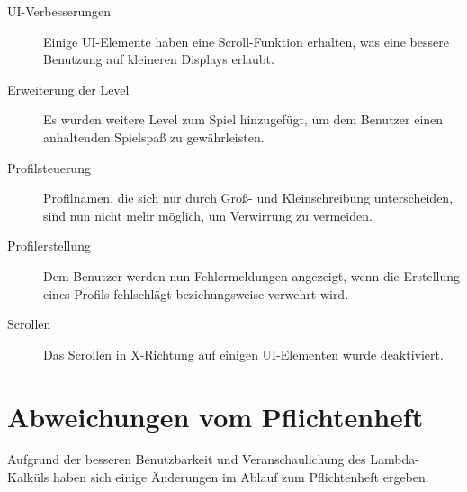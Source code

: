 \documentclass[parskip=full]{scrreprt}
\begin{document}
\begin{description}
	\item[UI-Verbesserungen] Einige UI-Elemente haben eine Scroll-Funktion erhalten, was eine bessere Benutzung auf kleineren Displays erlaubt.
	\item[Erweiterung der Level] Es wurden weitere Level zum Spiel hinzugefügt, um dem Benutzer einen anhaltenden Spielspaß zu gewährleisten.
	\item[Profilsteuerung] Profilnamen, die sich nur durch Groß- und Kleinschreibung unterscheiden, sind nun nicht mehr möglich, um Verwirrung zu vermeiden.
	\item[Profilerstellung] Dem Benutzer werden nun Fehlermeldungen angezeigt, wenn die Erstellung eines Profils fehlschlägt beziehungsweise verwehrt wird.
	\item[Scrollen] Das Scrollen in X-Richtung auf einigen UI-Elementen wurde deaktiviert.
\end{description}

\chapter{Abweichungen vom Pflichtenheft}
Aufgrund der besseren Benutzbarkeit und Veranschaulichung des Lambda-Kalküls haben sich einige Änderungen im Ablauf zum Pflichtenheft ergeben.
\end{document}
